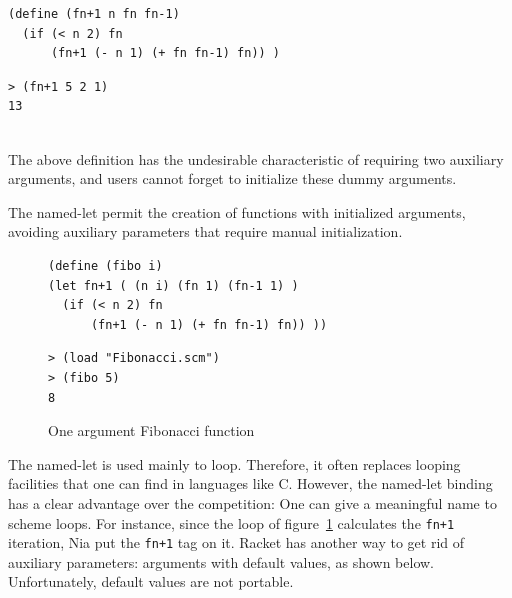 \documentclass[a4paper,12pt]{book}
\newenvironment{fmpage}[1]
{\begin{lrbox}{\fmbox}\begin{minipage}{#1}}
{\end{minipage}\end{lrbox}\fbox{\usebox{\fmbox}}}
\begin{document}
\begin{fmpage}{0.9\linewidth}
\begin{verbatim}
(define (fn+1 n fn fn-1)
  (if (< n 2) fn
      (fn+1 (- n 1) (+ fn fn-1) fn)) )
\end{verbatim}
\end{fmpage}

\begin{fmpage}{0.9\linewidth}
\begin{verbatim}
> (fn+1 5 2 1)
13
\end{verbatim}
\end{fmpage}

\verb||\\
The above definition has the
undesirable characteristic of
requiring two auxiliary arguments,
and users cannot forget to initialize
these dummy arguments. 

The named-let
permit the creation of functions
with initialized arguments, avoiding
auxiliary parameters that require manual initialization.

\begin{figure}[!h]
\begin{fmpage}{0.9\linewidth}
\begin{verbatim}
(define (fibo i)
(let fn+1 ( (n i) (fn 1) (fn-1 1) )
  (if (< n 2) fn
      (fn+1 (- n 1) (+ fn fn-1) fn)) ))

\end{verbatim}
\end{fmpage}

\begin{fmpage}{0.9\linewidth}
\begin{verbatim}
> (load "Fibonacci.scm")
> (fibo 5)
8
\end{verbatim}
\end{fmpage}
\caption{One argument Fibonacci function}
\label{oneargfib}
\end{figure}

The named-let is used mainly
to loop. Therefore, it often replaces looping
facilities that one can find in languages
like C. However, the named-let binding has a
clear advantage over the competition: One can
give a meaningful 
name
to scheme loops.
For instance, since the loop of
figure~\ref{oneargfib} calculates the \verb|fn+1|
iteration, Nia put the \verb|fn+1| tag on it.
Racket has another way to get rid of auxiliary 
parameters:
arguments with default values, as shown below. Unfortunately,
default values are not portable.
\end{document}

